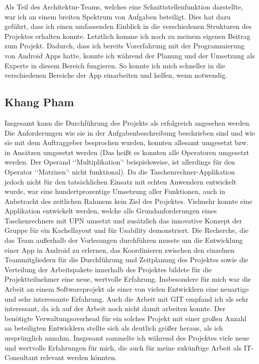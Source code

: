Als Teil des Architektur-Teams, welches eine Schnittstellenfunktion darstellte, war ich an einem breiten Spektrum von Aufgaben beteiligt. Dies hat dazu geführt, dass ich einen umfassenden Einblick in die verschiedenen Strukturen des Projektes erhalten konnte. 
Letztlich komme ich noch zu meinem eigenen Beitrag zum Projekt. Dadurch, dass ich bereits Vorerfahrung mit der Programmierung von Android Apps hatte, konnte ich während der Planung und der Umsetzung als Experte in diesem Bereich fungieren. So konnte ich mich schneller in die verschiedenen Bereiche der App einarbeiten und helfen, wenn notwendig. 


\subsection{Khang Pham}
Insgesamt kann die Durchführung des Projekts als erfolgreich angesehen werden. Die Anforderungen wie sie in der Aufgabenbeschreibung beschrieben sind und wie sie mit dem Auftraggeber besprochen wurden, konnten allesamt umgesetzt bzw. in Ansätzen umgesetzt werden (Das heißt es konnten alle Operatoren umgesetzt werden. Der Operand ‘‘Multiplikation’‘ beispielsweise, ist allerdings für den Operator ‘‘Matrizen’‘ nicht funktional). Da die Taschenrechner-Applikation jedoch nicht für den tatsächlichen Einsatz mit echten Anwendern entwickelt wurde, war eine hundertprozentige Umsetzung aller Funktionen, auch in Anbetracht des zeitlichen Rahmens kein Ziel des Projektes. Vielmehr konnte eine Applikation entwickelt werden, welche alle Grundanforderungen eines Taschenrechners mit UPN umsetzt und zusätzlich das innovative Konzept der Gruppe für ein Kachellayout und für Usability demonstriert. Die Recherche, die das Team außerhalb der Vorlesungen durchführen musste um die Entwicklung einer App in Android zu erlernen, das Koordinieren zwischen den einzelnen Teammitgliedern für die Durchführung und Zeitplanung des Projektes sowie die Verteilung der Arbeitspakete innerhalb des Projektes bildete für die Projektteilnehmer eine neue, wertvolle Erfahrung.
Insbesondere für mich war die Arbeit an einem Softwareprojekt als einer von vielen Entwicklern eine neuartige und sehr interessante Erfahrung. Auch die Arbeit mit GIT empfand ich als sehr interessant, da ich auf der Arbeit noch nicht damit arbeiten konnte. Der benötigte Verwaltungsoverhead für ein solches Projekt mit einer großen Anzahl an beteiligten Entwicklern stellte sich als deutlich größer heraus, als ich ursprünglich annahm. Insgesamt sammelte ich während des Projektes viele neue und wertvolle Erfahrungen für mich, die auch für meine zukünftige Arbeit als IT-Consultant relevant werden könnten. 

